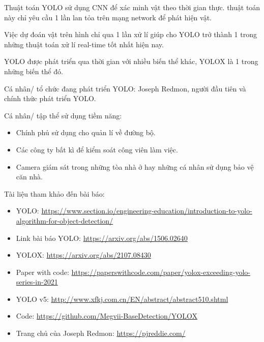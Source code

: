 \documentclass{article}
\begin{document}
	Thuật toán YOLO sử dụng CNN để xác minh vật theo thời gian thực. thuật toán này chỉ yêu cầu 1 lần lan tỏa trên mạng network để phát hiện vật. 

	Việc dự đoán vật trên hình chỉ qua 1 lần xử lí giúp cho YOLO trở thành 1 trong những thuật toán xử lí real-time tốt nhất hiện nay. 

	YOLO được phát triển qua thời gian với nhiều biến thể khác, YOLOX là 1 trong những biến thể đó.
	
	Cá nhân/ tổ chức đang phát triển YOLO: Joseph Redmon, người đầu tiên và chính thức phát triển YOLO.
	
	Cá nhân/ tập thể sử dụng tiềm năng:
	\begin{itemize}
		\item Chính phủ sử dụng cho quản lí về đường bộ.
		\item Các công ty bất kì để kiểm soát công viên làm việc.
		\item Camera giám sát trong những tòa nhà ở hay những cá nhân sử dụng bảo vệ căn nhà.
	\end{itemize}
	Tài liệu tham khảo đến bài báo:
	\begin{itemize}
		\item YOLO: \href{https://www.section.io/engineering-education/introduction-to-yolo-algorithm-for-object-detection/}{https://www.section.io/engineering-education/introduction-to-yolo-algorithm-for-object-detection/}
		\item Link bài báo YOLO: \href{https://arxiv.org/abs/1506.02640}{https://arxiv.org/abs/1506.02640}
		\item YOLOX: \href{https://arxiv.org/abs/2107.08430}{https://arxiv.org/abs/2107.08430}
		\item Paper with code: \href{https://paperswithcode.com/paper/yolox-exceeding-yolo-series-in-2021}{https://paperswithcode.com/paper/yolox-exceeding-yolo-series-in-2021}
		\item YOLO v5: \href{http://www.xfkj.com.cn/EN/abstract/abstract510.shtml}{http://www.xfkj.com.cn/EN/abstract/abstract510.shtml}
		\item Code: \href{https://github.com/Megvii-BaseDetection/YOLOX}{https://github.com/Megvii-BaseDetection/YOLOX}
		\item Trang chủ của Joseph Redmon: \href{https://pjreddie.com/}{https://pjreddie.com/}
	\end{itemize}
	
\end{document}
